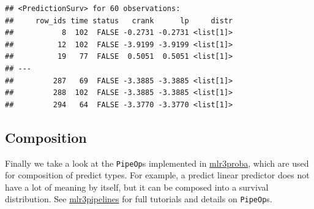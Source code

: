 \documentclass[
]{scrbook}
\newenvironment{Shaded}{\begin{snugshade}}{\end{snugshade}}
\newcommand{\AttributeTok}[1]{\textcolor[rgb]{0.77,0.63,0.00}{#1}}
\newcommand{\FloatTok}[1]{\textcolor[rgb]{0.00,0.00,0.81}{#1}}
\newcommand{\FunctionTok}[1]{\textcolor[rgb]{0.00,0.00,0.00}{#1}}
\newcommand{\NormalTok}[1]{#1}
\newcommand{\OtherTok}[1]{\textcolor[rgb]{0.56,0.35,0.01}{#1}}
\newcommand{\SpecialCharTok}[1]{\textcolor[rgb]{0.00,0.00,0.00}{#1}}
\newcommand{\StringTok}[1]{\textcolor[rgb]{0.31,0.60,0.02}{#1}}
\renewenvironment{Shaded} {\begin{snugshade}\small} {\end{snugshade}}
\begin{document}
\begin{Shaded}
\end{Shaded}

\begin{verbatim}
## <PredictionSurv> for 60 observations:
##     row_ids time status   crank      lp     distr
##           8  102  FALSE -0.2731 -0.2731 <list[1]>
##          12  102  FALSE -3.9199 -3.9199 <list[1]>
##          19   77  FALSE  0.5051  0.5051 <list[1]>
## ---                                              
##         287   69  FALSE -3.3885 -3.3885 <list[1]>
##         288  102  FALSE -3.3885 -3.3885 <list[1]>
##         294   64  FALSE -3.3770 -3.3770 <list[1]>
\end{verbatim}

\hypertarget{composition}{%
\subsection{Composition}\label{composition}}

Finally we take a look at the \texttt{PipeOp}s implemented in \href{https://mlr3proba.mlr-org.com}{mlr3proba}, which are used for composition of predict types.
For example, a predict linear predictor does not have a lot of meaning by itself, but it can be composed into a survival distribution.
See \href{https://mlr3pipelines.mlr-org.com}{mlr3pipelines} for full tutorials and details on \texttt{PipeOp}s.
\end{document}
